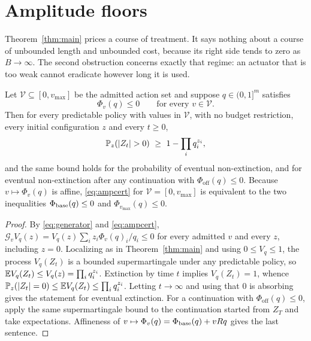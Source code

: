 \section{Amplitude floors}
\label{sec:amplitude}

Theorem~\ref{thm:main} prices a course of treatment. It says nothing about a
course of unbounded length and unbounded cost, because its right side tends to
zero as $B\to\infty$. The second obstruction concerns exactly that regime: an
actuator that is too weak cannot eradicate however long it is used.

\begin{theorem}\label{thm:amp}
Let $\mathcal V\subseteq[0,v_{\max}]$ be the admitted action set and suppose
$q\in(0,1]^m$ satisfies
\begin{equation}\label{eq:ampcert}
 \Phi_v(q)\le0\qquad\text{for every }v\in\mathcal V .
\end{equation}
Then for every predictable policy with values in $\mathcal V$, with no budget
restriction, every initial configuration $z$ and every $t\ge0$,
\begin{equation}\label{eq:ampbound}
 \Prob_z(|Z_t|>0)\ \ge\ 1-\prod_iq_i^{z_i},
\end{equation}
and the same bound holds for the probability of eventual non-extinction, and for
eventual non-extinction after any continuation with
$\Phi_{\mathrm{off}}(q)\le0$. Because $v\mapsto\Phi_v(q)$ is affine,
\eqref{eq:ampcert} for $\mathcal V=[0,v_{\max}]$ is equivalent to the two
inequalities $\Phi_{\mathrm{base}}(q)\le0$ and $\Phi_{v_{\max}}(q)\le0$.
\end{theorem}

\begin{proof}
By \eqref{eq:generator} and \eqref{eq:ampcert},
$\mathcal G_vV_q(z)=V_q(z)\sum_iz_i\Phi_v(q)_i/q_i\le0$ for every admitted $v$
and every $z$, including $z=0$. Localizing as in Theorem~\ref{thm:main} and
using $0\le V_q\le1$, the process $V_q(Z_t)$ is a bounded supermartingale under
any predictable policy, so $\mathbb E V_q(Z_t)\le V_q(z)=\prod_iq_i^{z_i}$. Extinction
by time $t$ implies $V_q(Z_t)=1$, whence
$\mathbb P_z(|Z_t|=0)\le\mathbb E V_q(Z_t)\le\prod_iq_i^{z_i}$. Letting $t\to\infty$ and
using that $0$ is absorbing gives the statement for eventual extinction. For a
continuation with $\Phi_{\mathrm{off}}(q)\le0$, apply the same supermartingale
bound to the continuation started from $Z_T$ and take expectations. Affineness
of $v\mapsto\Phi_v(q)=\Phi_{\mathrm{base}}(q)+vRq$ gives the last sentence.
\end{proof}

